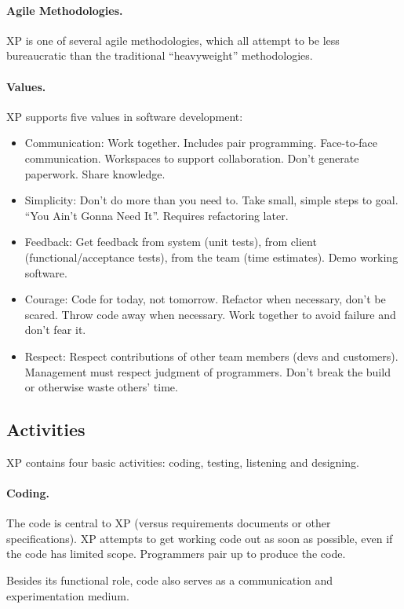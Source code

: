 \paragraph{Agile Methodologies.} XP is one of several agile methodologies,
which all attempt to be less bureaucratic than the traditional
``heavyweight'' methodologies. 

\paragraph{Values.} XP supports five values in software development:

\begin{itemize}
\item Communication:
 Work together. Includes pair programming. Face-to-face communication.
 Workspaces to support collaboration. Don't generate paperwork.
 Share knowledge.
\item Simplicity:
Don't do more than you need to. Take small, simple steps to goal.
``You Ain't Gonna Need It''. Requires refactoring later.
\item Feedback:
 Get feedback from system (unit tests), from client (functional/acceptance 
 tests), from the team (time estimates). Demo working software.
\item Courage:
 Code for today, not tomorrow.
 Refactor when necessary, don't be scared.
 Throw code away when necessary.
 Work together to avoid failure and don't fear it.
\item Respect:
 Respect contributions of other team members (devs and customers).
 Management must respect judgment of programmers.
 Don't break the build or otherwise waste others' time.
\end{itemize}

\subsection*{Activities} 
XP contains four basic activities: coding, testing, listening and
designing.

\paragraph{Coding.} The code is central to XP (versus requirements documents
or other specifications). XP attempts to get working code out as soon
as possible, even if the code has limited scope. Programmers pair up to
produce the code.

Besides its functional role, code also serves as a communication and 
experimentation medium.

